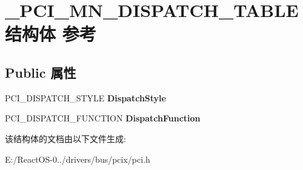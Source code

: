 \hypertarget{struct___p_c_i___m_n___d_i_s_p_a_t_c_h___t_a_b_l_e}{}\section{\+\_\+\+P\+C\+I\+\_\+\+M\+N\+\_\+\+D\+I\+S\+P\+A\+T\+C\+H\+\_\+\+T\+A\+B\+L\+E结构体 参考}
\label{struct___p_c_i___m_n___d_i_s_p_a_t_c_h___t_a_b_l_e}
\subsection*{Public 属性}
\begin{DoxyCompactItemize}
\item 
\mbox{\label{struct___p_c_i___m_n___d_i_s_p_a_t_c_h___t_a_b_l_e_a748d3bb0c0aaa88fc35d7d92d23b39e8}} 
P\+C\+I\+\_\+\+D\+I\+S\+P\+A\+T\+C\+H\+\_\+\+S\+T\+Y\+LE {\bfseries Dispatch\+Style}
\item 
\mbox{\label{struct___p_c_i___m_n___d_i_s_p_a_t_c_h___t_a_b_l_e_a90dd2c4a2e66c1348fac831df441c5d4}} 
P\+C\+I\+\_\+\+D\+I\+S\+P\+A\+T\+C\+H\+\_\+\+F\+U\+N\+C\+T\+I\+ON {\bfseries Dispatch\+Function}
\end{DoxyCompactItemize}


该结构体的文档由以下文件生成\+:\begin{DoxyCompactItemize}
\item 
E\+:/\+React\+O\+S-\/0../drivers/bus/pcix/pci.\+h\end{DoxyCompactItemize}
